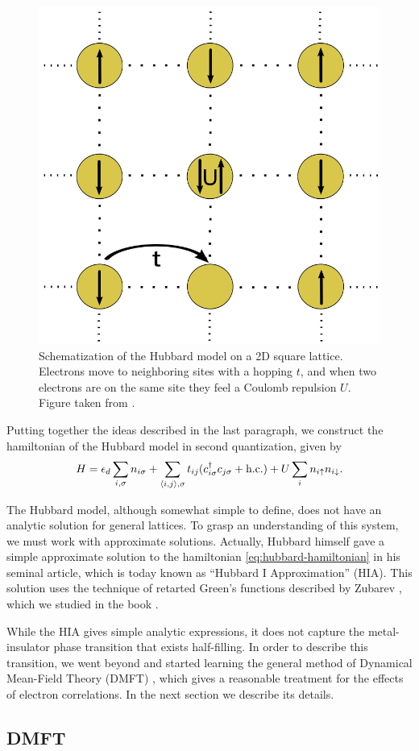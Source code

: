 \documentclass[12pt]{report}
\begin{document}
\begin{figure}[H]
\centering
\includegraphics[width=0.29\linewidth]{fig/hubbard_model-scheme.png}
\caption{Schematization of the Hubbard model on a 2D square lattice. Electrons move to neighboring sites with a hopping $t$, and when two electrons are on the same site they feel a Coulomb repulsion $U$. Figure taken from \cite{thesis_dmft_graz}.}
\label{fig:hubbard_model-scheme}
\end{figure}

Putting together the ideas described in the last paragraph, we construct the hamiltonian of the Hubbard model in second quantization, given by
\begin{equation} \label{eq:hubbard-hamiltonian}
H = \epsilon_d \sum_{i, {\sigma}} n_{i{\sigma}} +  \sum_{\left\langle i , j \right\rangle, {\sigma}} t_{ij} (c_{i{\sigma}}^\dagger c_{j{\sigma}} + {\text{h.c.}})
+ U \sum_{i} n_{i{\uparrow}} n_{i{\downarrow}}.
\end{equation}

The Hubbard model, although somewhat simple to define, does not have an analytic solution for general lattices. To grasp an understanding of this system, we must work with approximate solutions. Actually, Hubbard himself gave a simple approximate solution to the hamiltonian \ref{eq:hubbard-hamiltonian} in his seminal article, which is today known as ``Hubbard I Approximation'' (HIA). This solution uses the technique of retarted Green's functions described by Zubarev \cite{zubarev1960}, which we studied in the book \cite{bruus}.

While the HIA gives simple analytic expressions, it does not capture the metal-insulator phase transition that exists half-filling. In order to describe this transition, we went beyond and started learning the general method of Dynamical Mean-Field Theory (DMFT) \cite{georges1996}, which gives a reasonable treatment for the effects of electron correlations. In the next section we describe its details.

\subsection{DMFT} \label{sec:dmft}
\end{document}
